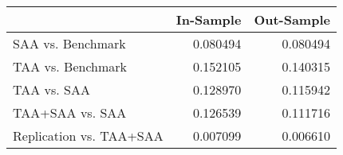 \begin{tabular}{lrr}
\toprule
{} &  In-Sample &  Out-Sample \\
\midrule
SAA vs. Benchmark       &   0.080494 &    0.080494 \\
TAA vs. Benchmark       &   0.152105 &    0.140315 \\
TAA vs. SAA             &   0.128970 &    0.115942 \\
TAA+SAA vs. SAA         &   0.126539 &    0.111716 \\
Replication vs. TAA+SAA &   0.007099 &    0.006610 \\
\bottomrule
\end{tabular}
